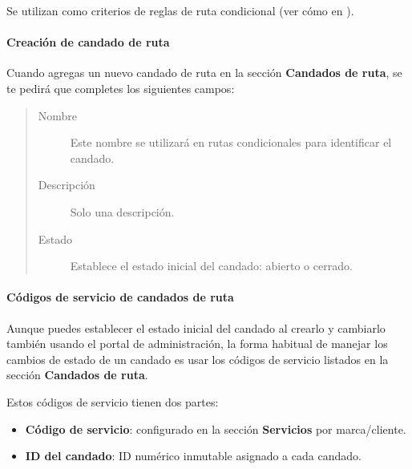 \documentclass[letterpaper,10pt,spanish]{sphinxmanual}
\begin{document}
Se utilizan como criterios de reglas de ruta condicional (ver cómo en {\hyperref[administration_portal/client/vpbx/routing_endpoints/conditional_routes:conditional\string-routes]{}}).


\paragraph{Creación de candado de ruta}
\label{administration_portal/client/vpbx/routing_tools/route_locks:route-lock-creation}
Cuando agregas un nuevo candado de ruta en la sección \textbf{Candados de ruta}, se te pedirá que completes los siguientes campos:
\begin{quote}
\begin{description}
\item[{Nombre}] \leavevmode
Este nombre se utilizará en rutas condicionales para identificar el candado.

\item[{Descripción}] \leavevmode
Solo una descripción.

\item[{Estado}] \leavevmode
Establece el estado inicial del candado: abierto o cerrado.

\end{description}
\end{quote}


\paragraph{Códigos de servicio de candados de ruta}
\label{administration_portal/client/vpbx/routing_tools/route_locks:route-locks-service-codes}
Aunque puedes establecer el estado inicial del candado al crearlo y cambiarlo también usando el portal de administración, la forma habitual de manejar los cambios de estado de un candado es usar los códigos de servicio listados en la sección \textbf{Candados de ruta}.

Estos códigos de servicio tienen dos partes:
\begin{itemize}
\item {} 
\textbf{Código de servicio}: configurado en la sección \textbf{Servicios} por marca/cliente.

\item {} 
\textbf{ID del candado}: ID numérico inmutable asignado a cada candado.

\end{itemize}
\end{document}
